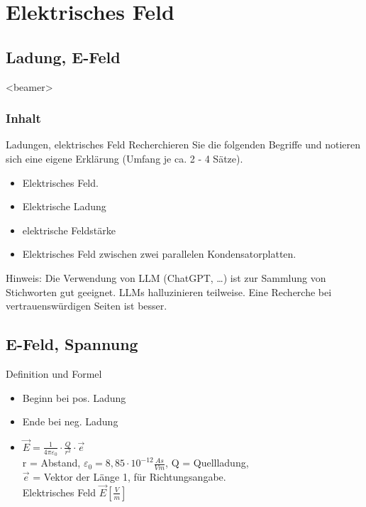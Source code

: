 \section{Elektrisches Feld}
\subsection{Ladung, E-Feld}

\begin{frame}<beamer>
  \frametitle{Inhalt}
  \tableofcontents[hideothersubsections]
\end{frame}

\begin{frame}{Ladungen, elektrisches Feld}
 Recherchieren Sie die folgenden Begriffe und notieren sich eine eigene Erklärung (Umfang je ca. 2 - 4 Sätze).
  \begin{itemize}
  \item Elektrisches Feld.
  \item Elektrische Ladung
  \item elektrische Feldstärke
  \item Elektrisches Feld zwischen zwei parallelen Kondensatorplatten.
 \end{itemize}
Hinweis: Die Verwendung von LLM (ChatGPT, \dots) ist zur Sammlung von Stichworten gut geeignet. LLMs halluzinieren teilweise. Eine Recherche bei vertrauenswürdigen Seiten ist besser.
\end{frame}

\subsection{E-Feld, Spannung}
\begin{frame}{Definition und Formel}
\begin{itemize}
  \item Beginn bei pos. Ladung 
  \item Ende bei neg. Ladung
  \item $\vec{E} = \frac{1}{4\pi \varepsilon_0} \cdot \frac{Q}{r^2}\cdot\vec{e}$\\ r = Abstand,  $\varepsilon_0 = 8,85 \cdot 10^{-12}\frac{As}{Vm}$, Q = Quellladung, \\$\vec{e}$ = Vektor der Länge 1, für Richtungsangabe. \\Elektrisches Feld $\vec{E}\left[\frac{V}{m}\right]$
\end{itemize} 
\end{frame}

